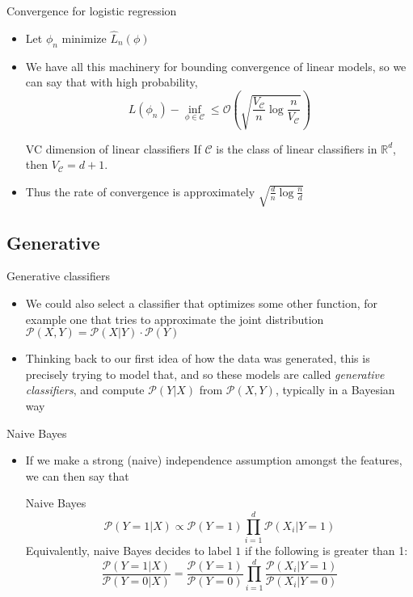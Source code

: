\documentclass{beamer}
\renewcommand{\Pr}[1]{\mathcal{P} \left( #1 \right)}
\newcommand{\cls}{\mathcal{C}}
\newcommand{\R}{\mathbb{R}}
\newcommand{\pa}[1]{\left( #1 \right)}
\begin{document}
\begin{frame}{Convergence for logistic regression}
\begin{itemize}
\item Let $\phi_n$ minimize $\hat{L}_n(\phi)$
\item We have all this machinery for bounding convergence of linear models, so we can say that with high probability,
\[ L(\phi_n) - \inf_{\phi \in \cls} \leq \mathcal O \pa{ \sqrt{\frac{V_\cls}{n} \log\frac{n}{V_\cls}}} \]
\begin{block}{VC dimension of linear classifiers}
If $\cls$ is the class of linear classifiers in $\R^d$, then $V_\cls = d+1$.
\end{block}
\item Thus the rate of convergence is approximately $\sqrt{\frac dn \log \frac nd}$
\end{itemize}
\end{frame}

\subsection{Generative}
\begin{frame}{Generative classifiers}
\begin{itemize}
\item We could also select a classifier that optimizes some other function, for example one that tries to approximate the joint distribution $\Pr{X,Y} = \Pr{X|Y} \cdot \Pr{Y}$
\item Thinking back to our first idea of how the data was generated, this is precisely trying to model that, and so these models are called \emph{generative classifiers}, and compute $\Pr{Y|X}$ from $\Pr{X,Y}$, typically in a Bayesian way
\end{itemize}
\end{frame}

\begin{frame}{Naive Bayes}
\begin{itemize}
\item If we make a strong (naive) independence assumption amongst the features, we can then say that
\begin{block}{Naive Bayes}
\[ \Pr{Y=1|X} \propto \Pr{Y=1} \prod_{i=1}^d \Pr{X_i | Y=1} \]
Equivalently, naive Bayes decides to label $1$ if the following is greater than 1:
\[ \frac{\Pr{Y=1|X}}{\Pr{Y=0|X}} = \frac{\Pr{Y=1}}{\Pr{Y=0}} \prod_{i=1}^d \frac{\Pr{X_i|Y=1}}{\Pr{X_i|Y=0}} \]
\end{block}
\end{itemize}
\end{frame}
\end{document}
